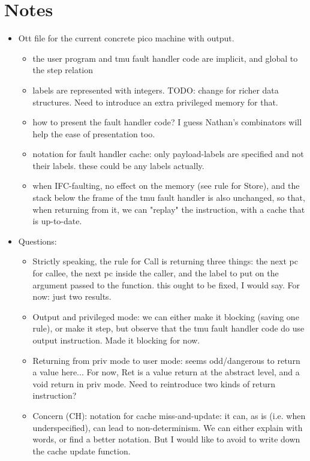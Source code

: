 \documentclass{article}
\begin{document}
\section*{Notes}

\begin{itemize}
\item Ott file for the current concrete pico machine with output.
  \begin{itemize}
    \item the user program and tmu fault handler code are implicit,
      and global to the step relation
    \item labels are represented with integers. TODO: change for
      richer data structures. Need to introduce an extra privileged
      memory for that.
    \item how to present the fault handler code? I guess Nathan's
      combinators will help the ease of presentation too.
    \item notation for fault handler cache: only payload-labels are
      specified and not their labels. these could be any labels actually.
    \item when IFC-faulting, no effect on the memory (see rule for
      Store), and the stack below the frame of the tmu fault handler
      is also unchanged, so that, when returning from it, we can
      "replay" the instruction, with a cache that is up-to-date.
  \end{itemize}
\item Questions:
  \begin{itemize}
    \item Strictly speaking, the rule for Call is returning three
      things: the next pc for callee, the next pc inside the caller,
      and the label to put on the argument passed to the function.
      this ought to be fixed, I would say. For now: just two results.
    \item Output and privileged mode: we can either make it blocking
      (saving one rule), or make it step, but observe that the tmu
      fault handler code do use output instruction. Made it blocking
      for now.
    \item Returning from priv mode to user mode: seems odd/dangerous
      to return a value here... For now, Ret is a value return at the
      abstract level, and a void return in priv mode. Need to
      reintroduce two kinds of return instruction?
    \item Concern (CH): notation for cache miss-and-update: it can, as
      is (i.e. when underspecified), can lead to non-determinism.  We
      can either explain with words, or find a better notation. But I
      would like to avoid to write down the cache update function.
  \end{itemize}
\end{itemize}
\end{document}
